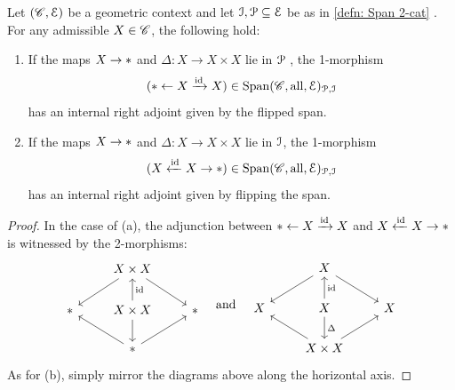 \begin{lem}\label{lem: internal adjoints}
  Let $(\mathscr{C},\mathcal{E})$ be a geometric context and let $\mathcal{I},\mathcal{P}\subseteq \mathcal{E}$ be as in 
  \cref{defn: Span 2-cat} . For any admissible $X\in \mathscr{C}$, the 
  following hold:
  \begin{enumerate}[label=(\alph*)]
    \item If the maps $X\to \ast$ and $\Delta\colon X\to X\times X$ lie in $\mathcal{P}$ , 
      the 1-morphism \[(\ast\leftarrow X\xrightarrow{\operatorname{id}} X)\in \operatorname{\mathrm{Span}}({\mathscr{C}, \mathrm{all} ,\mathcal{E}})_{\mathcal{P},\mathcal{I}}\]
      has an internal right adjoint given by the flipped span.
  \item If the maps $X\to \ast$ and $\Delta\colon X\to X\times X$ lie in $\mathcal{I}$, the 
    1-morphism \[(X\xleftarrow{\operatorname{id}} X\to \ast)\in \operatorname{\mathrm{Span}}({\mathscr{C}, \mathrm{all}, \mathcal{E}})_{\mathcal{P},\mathcal{I}}\] 
    has an internal right adjoint given by flipping the span.
  \end{enumerate}
\end{lem}
\begin{proof}
In the case of (a), the adjunction between $\ast\leftarrow X\xrightarrow{\operatorname{id}} X$ and $X\xleftarrow{\operatorname{id}} X\to \ast$ is witnessed by the 2-morphisms:
\[\begin{tikzcd}
	& X\times X & \\
	\pt & X\times X & \pt \\
	& \pt
	\arrow[from=1-2, to=2-1]
	\arrow[from=1-2, to=2-3]
	\arrow["\id"', from=2-2, to=1-2]
	\arrow[ from=2-2, to=3-2]
	\arrow[from=3-2, to=2-1]
	\arrow[from=3-2, to=2-3]
\end{tikzcd}
\quad \text{and} \quad 
\begin{tikzcd}
	& X & \\
	 X & X  & X \\
	& X\times X
	\arrow[from=1-2, to=2-1]
	\arrow[from=1-2, to=2-3]
	\arrow["\id"', from=2-2, to=1-2]
	\arrow["\Delta", from=2-2, to=3-2]
	\arrow[ from=3-2, to=2-1]
	\arrow[ from=3-2, to=2-3]
\end{tikzcd}\]
  As for (b), simply mirror the diagrams above along the horizontal axis.
\end{proof}


